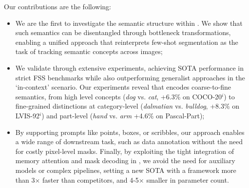 \noindent Our contributions are the following:

\begin{itemize}[noitemsep,topsep=1pt,leftmargin=*]
    \item We are the first to investigate the semantic structure within \sam{}. We show that such semantics can be disentangled through bottleneck transformations, enabling a unified approach that reinterprets few-shot segmentation as the task of tracking semantic concepts across images;
    
    \item We validate \ours{} through extensive experiments, achieving SOTA performance in strict FSS benchmarks while also outperforming generalist approaches in the ‘in-context’ scenario.
    Our experiments reveal that \sam{} encodes coarse-to-fine semantics, from high level concepts (\eg \textit{dog} vs. \textit{cat}, +6.3\% on COCO-20$^i$) to fine-grained distinctions at category-level (\eg \textit{dalmatian} vs. \textit{bulldog}, +8.3\% on LVIS-92$^i$) and part-level (\eg \textit{hand} vs. \textit{arm} +4.6\% on Pascal-Part);
    
    \item By supporting prompts like points, boxes, or scribbles, our approach enables a wide range of downstream task, such as data annotation without the need for costly pixel-level masks. Finally, by exploiting the tight integration of memory attention and mask decoding in \sam{}, we avoid the need for auxiliary models or complex pipelines, setting a new SOTA with a framework more than {3× faster} than competitors, and {4-5× smaller} in parameter count.
\end{itemize}


